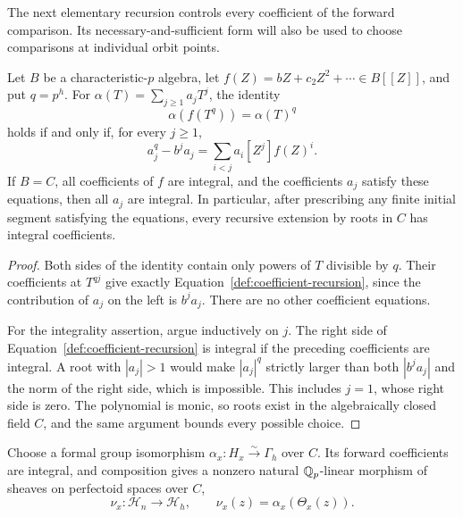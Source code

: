 The next elementary recursion controls every coefficient of the forward
comparison.  Its necessary-and-sufficient form will also be used to
choose comparisons at individual orbit points.

\begin{lemma}\label{def:recursion}
Let $B$ be a characteristic-$p$ algebra, let
$f(Z)=bZ+c_2Z^2+\cdots\in B[[Z]]$, and put $q=p^h$.
For $\alpha(T)=\sum_{j\ge1}a_jT^j$, the identity
\[
 \alpha(f(T^q))=\alpha(T)^q
\]
holds if and only if, for every $j\ge1$,
\begin{equation}
 a_j^q-b^ja_j
       =\sum_{i<j}a_i[Z^j]f(Z)^i.
 \label{def:coefficient-recursion}
\end{equation}
If $B=C$, all coefficients of $f$ are integral, and the coefficients
$a_j$ satisfy these equations, then all $a_j$ are integral.
In particular, after prescribing any finite initial segment satisfying
the equations, every recursive extension by roots in $C$ has integral
coefficients.
\end{lemma}

\begin{proof}
Both sides of the identity contain only powers of $T$ divisible by $q$.
Their coefficients at $T^{qj}$ give exactly
Equation~\eqref{def:coefficient-recursion}, since the contribution of $a_j$
on the left is $b^ja_j$.  There are no other coefficient equations.

For the integrality assertion, argue inductively on $j$.  The right
side of Equation~\eqref{def:coefficient-recursion} is integral if the
preceding coefficients are integral.  A root with $|a_j|>1$ would make
$|a_j|^q$ strictly larger than both $|b^ja_j|$ and the norm of the right
side, which is impossible.  This includes $j=1$, whose right side is
zero.  The polynomial is monic, so roots exist in the algebraically
closed field $C$, and the same argument bounds every possible choice.
\end{proof}

\begin{proposition}\label{def:natural-comparison}
Choose a formal group isomorphism
$\alpha_x:H_x\xrightarrow{\sim}\Gamma_h$ over $C$.
Its forward coefficients are integral, and composition gives a nonzero
natural $\mathbb Q_p$-linear morphism of sheaves on perfectoid spaces over $C$,
\begin{equation}
 \nu_x:\mathcal H_n\longrightarrow\mathcal H_h,
       \qquad \nu_x(z)=\alpha_x(\Theta_x(z)).
 \label{def:nu}
\end{equation}
\end{proposition}

